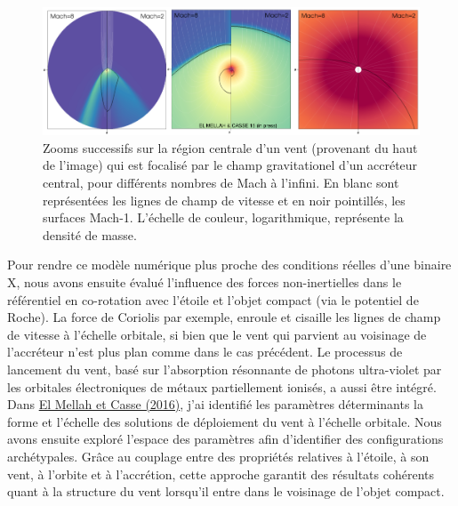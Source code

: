 \documentclass[a4paper,12pt,onecolumn]{article}
\begin{document}
\begin{figure}
\centering
\includegraphics[width=1\columnwidth]{Pictures/FIG3.png}
\caption{Zooms successifs sur la région centrale d'un vent (provenant du haut de l'image) qui est focalisé par le champ gravitationel d'un accréteur central, pour différents nombres de Mach à l'infini. En blanc sont représentées les lignes de champ de vitesse et en noir pointillés, les surfaces Mach-1. L'échelle de couleur, logarithmique, représente la densité de masse.}
\label{fig:fig3}
\end{figure} 

\indent Pour rendre ce modèle numérique plus proche des conditions réelles d'une binaire X, nous avons ensuite évalué l'influence des forces non-inertielles dans le référentiel en co-rotation avec l'étoile et l'objet compact (via le potentiel de Roche). La force de Coriolis par exemple, enroule et cisaille les lignes de champ de vitesse à l'échelle orbitale, si bien que le vent qui parvient au voisinage de l'accréteur n'est plus plan comme dans le cas précédent. Le processus de lancement du vent, basé sur l'absorption résonnante de photons ultra-violet par les orbitales électroniques de métaux partiellement ionisés, a aussi être intégré. Dans \href{https://academic.oup.com/mnras/article-abstract/467/3/2585/2961795/A-numerical-investigation-of-wind-accretion-in?redirectedFrom=fulltext}{El Mellah et Casse (2016)}, j'ai identifié les paramètres déterminants la forme et l'échelle des solutions de déploiement du vent à l'échelle orbitale. Nous avons ensuite exploré l'espace des paramètres afin d'identifier des configurations archétypales. Grâce au couplage entre des propriétés relatives à l'étoile, à son vent, à l'orbite et à l'accrétion, cette approche garantit des résultats cohérents quant à la structure du vent lorsqu'il entre dans le voisinage de l'objet compact.
\end{document}
